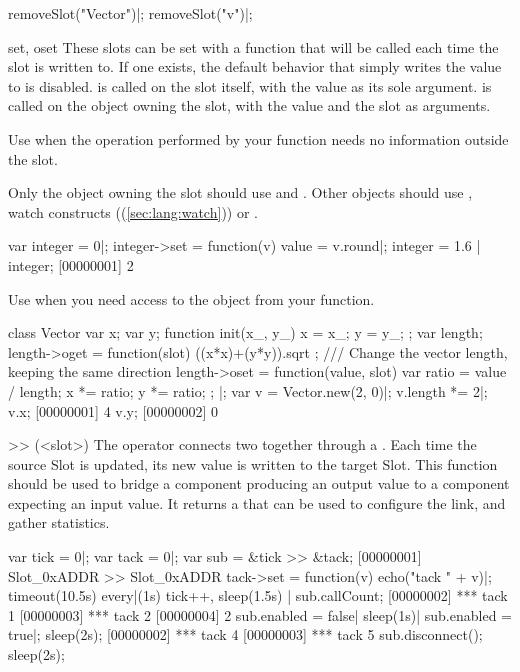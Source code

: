 \begin{urbiscriptapi}
\begin{urbicomment}
removeSlot("Vector")|;
removeSlot("v")|;
\end{urbicomment}

\item[set, oset]
  These slots can be set with a function that will be called each time the
  slot is written to. If one exists, the default behavior that simply writes
  the value to  is disabled.
   is called on the slot itself, with the value as its sole
  argument.  is called on the object owning the slot, with
  the value and the slot as arguments.

  Use  when the operation performed by your function needs no
  information outside the slot.

  Only the object owning the slot should use  and .
  Other objects should use , watch constructs
  ((\autoref{sec:lang:watch})) or .

\begin{urbiscript}
var integer = 0|;
integer->set = function(v) { value = v.round}|;
integer = 1.6 | integer;
[00000001] 2
\end{urbiscript}

  Use  when you need access to the object from your function.

\begin{urbiscript}
class Vector
{
  var x;
  var y;
  function init(x_, y_)
  {
    x = x_;
    y = y_;
  };
  var length;
  length->oget = function(slot) { ((x*x)+(y*y)).sqrt };
  /// Change the vector length, keeping the same direction
  length->oset = function(value, slot)
  {
    var ratio = value / length;
    x *= ratio;
    y *= ratio;
  };
}|;
var v = Vector.new(2, 0)|;
v.length *= 2|;
v.x;
[00000001] 4
v.y;
[00000002] 0
\end{urbiscript}

\item[>>](<slot>)%
  The  operator connects two  together through a
  . Each time the source Slot is updated, its new value
  is written to the target Slot.
  This function should be used to bridge a component producing an output value
  to a component expecting an input value.
  It returns a  that can be used to configure the link,
  and gather statistics.

\begin{urbiscript}
var tick = 0|;
var tack = 0|;
var sub = &tick >> &tack;
[00000001] Slot_0xADDR >> Slot_0xADDR
tack->set = function(v) { echo("tack " + v)}|;
timeout(10.5s) every|(1s) tick++,
sleep(1.5s) | sub.callCount;
[00000002] *** tack 1
[00000003] *** tack 2
[00000004] 2
sub.enabled = false| sleep(1s)| sub.enabled = true|;
sleep(2s);
[00000002] *** tack 4
[00000003] *** tack 5
sub.disconnect();
sleep(2s);
\end{urbiscript}


\end{urbiscriptapi}
